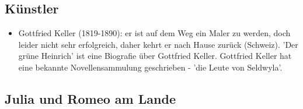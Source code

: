 \documentclass[12pt,a4paper]{article}
\begin{document}
\subsection{Künstler}

\begin{itemize}
\item Gottfried Keller (1819-1890): er ist auf dem Weg ein Maler zu werden, doch leider nicht sehr erfolgreich, daher kehrt er  nach Hause zurück (Schweiz). 'Der grüne Heinrich' ist eine Biografie über Gottfried Keller. Gottfried Keller hat eine bekannte Novellensammulung geschrieben - 'die Leute von Seldwyla'.
\end{itemize}

\subsection{Julia und Romeo am Lande}
\end{document}
